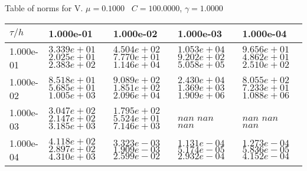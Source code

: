 \begin{center}
Table of norms for V. $\mu = 0.1000$ \, $C = 100.0000$, $\gamma = 1.0000$
  
\begin{tabular}{|p{1in}|p{1in}|p{1in}|p{1in}|p{1in}|} \hline
$\tau / h$ &1.000e-01 &1.000e-02 &1.000e-03 &1.000e-04 \\ \hline 
1.000e-01 & $3.339e+01$  $2.025e+01$  $2.383e+02$  & $4.504e+02$  $7.770e+01$  $1.146e+04$  & $1.053e+04$  $9.202e+02$  $5.058e+05$  & $9.656e+01$  $4.862e+01$  $2.510e+02$  \\ \hline 
1.000e-02 & $8.518e+01$  $5.685e+01$  $1.005e+03$  & $9.089e+02$  $1.851e+02$  $2.096e+04$  & $2.430e+04$  $1.369e+03$  $1.909e+06$  & $8.055e+02$  $7.233e+01$  $1.088e+06$  \\ \hline 
1.000e-03 & $3.047e+02$  $2.147e+02$  $3.185e+03$  & $1.795e+02$  $5.524e+01$  $7.146e+03$  & $nan$  $nan$  $nan$  & $nan$  $nan$  $nan$  \\ \hline 
1.000e-04 & $4.118e+02$  $2.897e+02$  $4.310e+03$  & $3.323e-03$  $1.909e-03$  $2.599e-02$  & $1.131e-04$  $5.174e-05$  $2.932e-04$  & $1.273e-04$  $5.836e-05$  $4.152e-04$  \\ \hline 

\end{tabular}\\[20pt]
\end{center}

